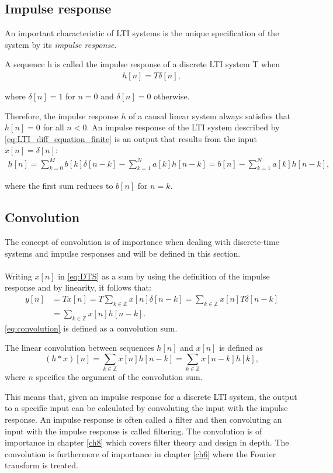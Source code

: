 \subsection{Impulse response}
An important characteristic of LTI systems is the unique specification of the system by its \textit{impulse response}.
\begin{definition}\label{def:impulse_response}
A sequence h is called the impulse response of a discrete LTI system T when
\begin{align}
h[n]=T\delta[n],
\end{align}

where $\delta[n] = 1$ for $n = 0$ and $\delta[n] = 0$ otherwise.
\end{definition}

Therefore, the impulse response $h$ of a causal linear system always satisfies that $h[n] = 0$ for all $n < 0$. An impulse response of the LTI system described by \eqref{eq:LTI_diff_equation_finite} is an output that results from the input $x[n] = \delta[n]$:
\begin{align*}
h[n] = \sum_{k=0}^M b[k] \delta[n-k] - \sum_{k=1}^N a[k] h[n-k] = b[n] - \sum_{k=1}^N a[k] h[n-k],
\end{align*}

where the first sum reduces to $b[n]$ for $n = k$.
\subsection{Convolution}\label{sec:convol}
The concept of convolution is of importance when dealing with discrete-time systems and impulse responses and will be defined in this section.\\\\
Writing $x[n]$ in \eqref{eq:DTS} as a sum by using the definition of the impulse response and by linearity, it follows that:
\begin{align}
y[n]&=Tx[n]
=T\sum_{k\in\mathbb{Z}}x[n]\delta[n-k]
=\sum_{k\in\mathbb{Z}}x[n]T\delta[n-k]\nonumber\\
&=\sum_{k\in\mathbb{Z}}x[n]h[n-k].\label{eq:convolution}
\end{align}
\eqref{eq:convolution} is defined as a convolution sum.

\begin{definition} \label{def:convolution}
The linear convolution between sequences $h[n]$ and $x[n]$ is defined as
\begin{equation}
(h*x)[n]=\sum_{k\in\mathbb{Z}}x[n]h[n-k]=\sum_{k\in\mathbb{Z}}x[n-k]h[k],
\end{equation}
where $n$ specifies the argument of the convolution sum.
\end{definition}
This means that, given an impulse response for a discrete LTI system, the output to a specific input can be calculated by convoluting the input with the impulse response. An impulse response is often called a filter and then convoluting an input with the impulse response is called filtering. The convolution is of importance in chapter \ref{ch8} which covers filter theory and design in depth. The convolution is furthermore of importance in chapter \ref{ch6} where the Fourier transform is treated.